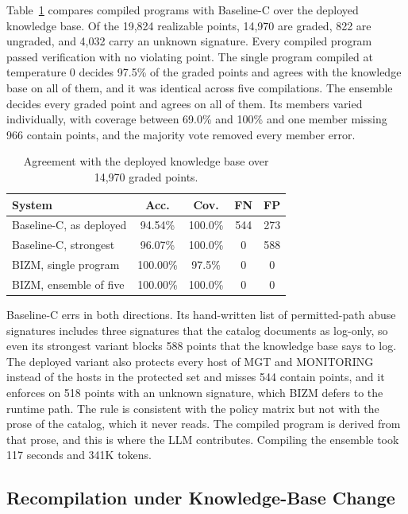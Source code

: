 \documentclass[final,5p]{elsarticle}
\begin{document}
Table~\ref{tab:compiled} compares compiled programs with Baseline-C over the deployed knowledge base. Of the 19,824 realizable points, 14,970 are graded, 822 are ungraded, and 4,032 carry an unknown signature. Every compiled program passed verification with no violating point. The single program compiled at temperature 0 decides 97.5\% of the graded points and agrees with the knowledge base on all of them, and it was identical across five compilations. The ensemble decides every graded point and agrees on all of them. Its members varied individually, with coverage between 69.0\% and 100\% and one member missing 966 contain points, and the majority vote removed every member error.

\begin{table}[t]
    \centering
    \caption{Agreement with the deployed knowledge base over 14,970 graded points.}
    \label{tab:compiled}
    \small
    \setlength{\tabcolsep}{4pt}
    \begin{tabular}{@{}lcccc@{}}
        \toprule
        \textbf{System} & \textbf{Acc.} & \textbf{Cov.} & \textbf{FN} & \textbf{FP} \\
        \midrule
        Baseline-C, as deployed  & 94.54\%  & 100.0\% & 544 & 273 \\
        Baseline-C, strongest    & 96.07\%  & 100.0\% & 0   & 588 \\
        BIZM, single program     & 100.00\% & 97.5\%  & 0   & 0   \\
        BIZM, ensemble of five   & 100.00\% & 100.0\% & 0   & 0   \\
        \bottomrule
    \end{tabular}
\end{table}

Baseline-C errs in both directions. Its hand-written list of permitted-path abuse signatures includes three signatures that the catalog documents as log-only, so even its strongest variant blocks 588 points that the knowledge base says to log. The deployed variant also protects every host of MGT and MONITORING instead of the hosts in the protected set and misses 544 contain points, and it enforces on 518 points with an unknown signature, which BIZM defers to the runtime path. The rule is consistent with the policy matrix but not with the prose of the catalog, which it never reads. The compiled program is derived from that prose, and this is where the LLM contributes. Compiling the ensemble took 117 seconds and 341K tokens.

\subsection{Recompilation under Knowledge-Base Change}
\label{sec:drift}
\end{document}
